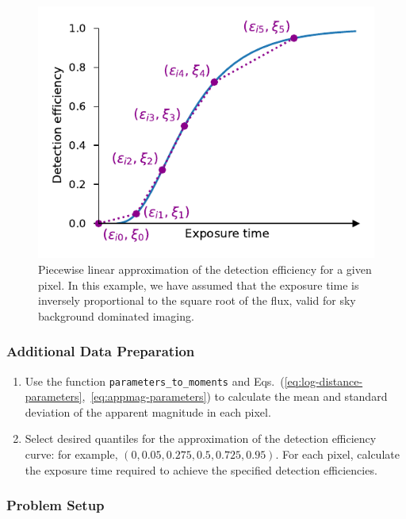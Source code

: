 \documentclass[twocolumn,times]{aastex631}
\begin{document}
\begin{figure}
    \includegraphics[width=\columnwidth]{figures/piecewise-linear-exptime}
    \caption{\label{fig:piecewise-linear-exptime}Piecewise linear approximation of the detection efficiency for a given pixel. In this example, we have assumed that the exposure time is inversely proportional to the square root of the flux, valid for sky background dominated imaging.}
\end{figure}

\subsubsection{Additional Data Preparation}

\begin{enumerate}
    \item Use the function \texttt{parameters\_to\_moments} and Eqs.~(\ref{eq:log-distance-parameters},~\ref{eq:appmag-parameters}) to calculate the mean and standard deviation of the apparent magnitude in each pixel.
    \item Select desired quantiles for the approximation of the detection efficiency curve: for example, $(0, 0.05 , 0.275, 0.5  , 0.725, 0.95)$. For each pixel, calculate the exposure time required to achieve the specified detection efficiencies.
\end{enumerate}

\subsubsection{Problem Setup}
\end{document}
